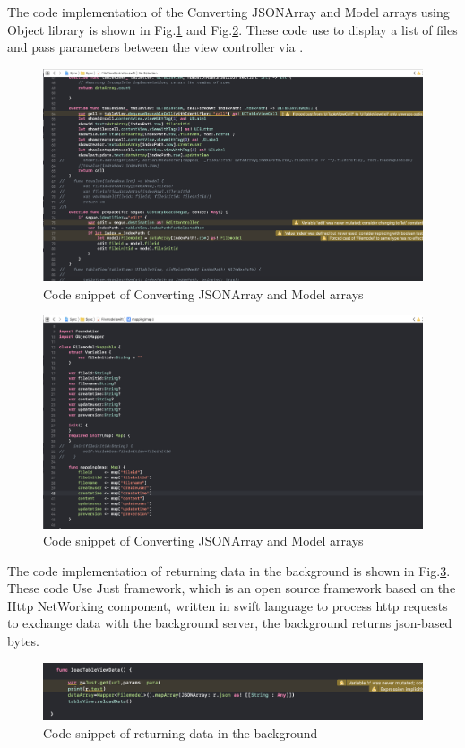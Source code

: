 \vspace{0.3cm}
\noindent The code implementation of the Converting JSONArray and Model arrays using Object library is shown in Fig.\ref{ccc} and Fig.\ref{cc1}. These code use  to display a list of files and pass parameters between the view controller via .
\begin{figure}[H]
  \centering
  \includegraphics[width=.8\textwidth]{c1.png}%
  \caption{Code snippet of Converting JSONArray and Model arrays} %
  \label{ccc} %
\end{figure}

\begin{figure}[H]
  \centering
  \includegraphics[width=.8\textwidth]{c2.png}%
  \caption{Code snippet of Converting JSONArray and Model arrays} %
  \label{cc1} %
\end{figure}

\noindent The code implementation of returning data in the background is shown in Fig.\ref{aaa}. These code Use Just framework, which is an open source framework based on the Http NetWorking component, written in swift language to process http requests to exchange data with the background server, the background returns json-based bytes.
\begin{figure}[H]
  \centering
  \includegraphics[width=.8\textwidth]{just.png}%
  \caption{Code snippet of returning data in the background} %
  \label{aaa} %
\end{figure}

